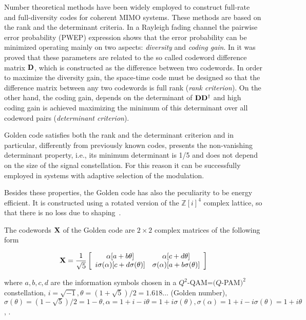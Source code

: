 \documentclass[12pt,onecolumn,draftclsnofoot]{IEEEtran}
\begin{document}
Number theoretical methods have been widely employed to construct
full-rate and full-diversity codes for coherent MIMO systems. These
methods are based on the rank and the determinant criteria. In a
Rayleigh fading channel the pairwise error probability (PWEP)
expression \cite{Criterion} shows that the error probability can be
minimized operating mainly on two aspects: {\em diversity} and {\em
coding gain}. In \cite{Criterion} it was proved that these
parameters are related to the so called codeword difference matrix
${\bf D}$, which is constructed as the difference between two
codewords. In order to maximize the diversity gain, the space-time
code must be designed so that the difference matrix between any two
codewords is full rank (\emph {rank criterion}). On the other hand,
the coding gain, depends on the determinant of ${\bf D}{\bf D}^\dag$
and high coding gain is achieved maximizing the minimum of this
determinant over all codeword pairs (\emph{determinant
criterion}).

Golden code satisfies both the rank and the determinant criterion
and in particular, differently from previously known codes, presents
the non-vanishing determinant property, i.e., its minimum
determinant is 1/5 and does not depend on the size of the signal
constellation. For this reason it can be successfully employed in
systems with adaptive selection of the modulation.

Besides these properties, the Golden code has also the peculiarity
to be energy efficient. It is constructed using a rotated version of
the $\mathbb{Z}[i]^4$  complex lattice, so that there is no loss due
to shaping~\cite{Golden1}.

The codewords ${\bf X}$ of the Golden code are $2\times 2$ complex
matrices of the following form 

\begin{equation}
{\bf X} = \frac{1}{\sqrt 5} \left[ \begin{array}{cc}
     \alpha [a + b\theta ] & \alpha [ c + d\theta ]\\
     i\sigma(\alpha)[c + d\sigma(\theta)] & \sigma(\alpha)[a + b\sigma(\theta)]\\
\end{array} \right]
\end{equation}

\noindent where $a, b, c, d$ are the information symbols chosen in a $Q^2$-QAM=$(Q$-PAM$)^2$ constellation,
$i=\sqrt{-1}, \theta=(1+\sqrt{5})/2 = 1.618 \ldots$ (Golden number), $\sigma(\theta)=
(1-\sqrt{5})/2 = 1-\theta, \alpha=1 + i - i \theta= 1 + i \sigma(\theta),
 \sigma(\alpha) = 1 + i - i \sigma(\theta) = 1 + i\theta$, \cite{GoldenPage}.
\end{document}
